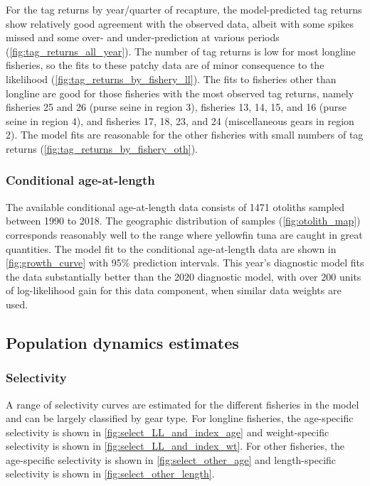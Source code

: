 For the tag returns by year/quarter of recapture, the model-predicted tag returns show relatively good agreement with the observed data, albeit with some spikes missed and some over- and under-prediction at various periods (\autoref{fig:tag_returns_all_year}). The number of tag returns is low for most longline fisheries, so the fits to these patchy data are of minor consequence to the likelihood (\autoref{fig:tag_returns_by_fishery_ll}). The fits to fisheries other than longline are good for those fisheries with the most observed tag returns, namely fisheries 25 and 26 (purse seine in region 3), fisheries 13, 14, 15, and 16 (purse seine in region 4), and fisheries 17, 18, 23, and 24 (miscellaneous gears in region 2). The model fits are reasonable for the other fisheries with small numbers of tag returns (\autoref{fig:tag_returns_by_fishery_oth}).

\subsubsection{Conditional age-at-length}
\label{sec:fit_CAAL}

The available conditional age-at-length data consists of 1471 otoliths sampled between 1990 to 2018. The geographic distribution of samples (\autoref{fig:otolith_map}) corresponds reasonably well to the range where yellowfin tuna are caught in great quantities. The model fit to the conditional age-at-length data are shown in \autoref{fig:growth_curve} with 95\% prediction intervals. This year's diagnostic model fits the data substantially better than the 2020 diagnostic model, with over 200 units of log-likelihood gain for this data component, when similar data weights are used.

\subsection{Population dynamics estimates}
\label{sec:pop_dynamics}

\subsubsection{Selectivity}
\label{sec:selectivity}

A range of selectivity curves are estimated for the different fisheries in the model and can be largely classified by gear type. For longline fisheries, the age-specific selectivity is shown in \autoref{fig:select_LL_and_index_age} and weight-specific selectivity is shown in \autoref{fig:select_LL_and_index_wt}. For other fisheries, the age-specific selectivity is shown in \autoref{fig:select_other_age} and length-specific selectivity is shown in \autoref{fig:select_other_length}.

